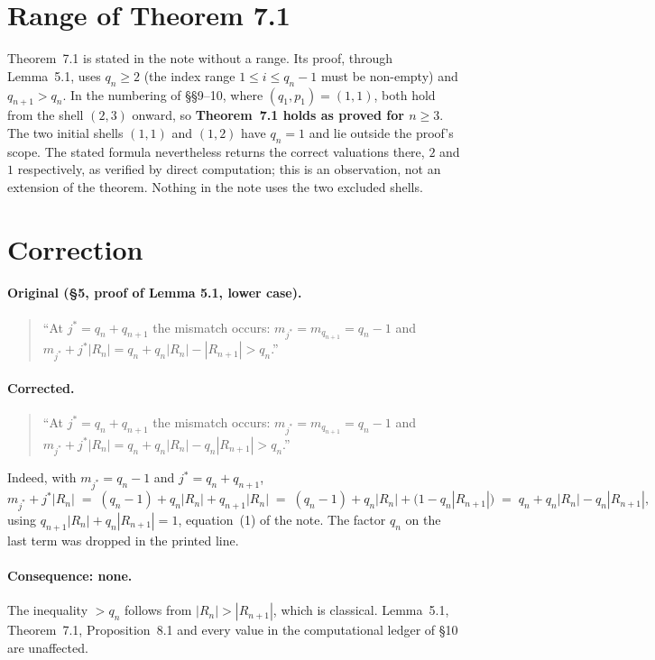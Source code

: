 \documentclass[10pt]{article}
\begin{document}
\section{Range of Theorem 7.1}

Theorem~7.1 is stated in the note without a range. Its proof, through Lemma~5.1, uses
$q_n\ge 2$ (the index range $1\le i\le q_n-1$ must be non-empty) and $q_{n+1}>q_n$. In the
numbering of \S\S9--10, where $(q_1,p_1)=(1,1)$, both hold from the shell $(2,3)$ onward, so
\textbf{Theorem~7.1 holds as proved for $n\ge 3$}. The two initial shells $(1,1)$ and $(1,2)$ have $q_n=1$ and lie outside the proof's scope. The
stated formula nevertheless returns the correct valuations there, $2$ and $1$ respectively, as
verified by direct computation; this is an observation, not an extension of the theorem. Nothing
in the note uses the two excluded shells.

\section{Correction}
\label{sec:typo}

\paragraph{Original (\S5, proof of Lemma 5.1, lower case).}
\begin{quote}
``At $j^*=q_n+q_{n+1}$ the mismatch occurs: $m_{j^*}=m_{q_{n+1}}=q_n-1$ and
$m_{j^*}+j^*|R_n| = q_n+q_n|R_n|-|R_{n+1}| > q_n$.''
\end{quote}

\paragraph{Corrected.}
\begin{quote}
``At $j^*=q_n+q_{n+1}$ the mismatch occurs: $m_{j^*}=m_{q_{n+1}}=q_n-1$ and
$m_{j^*}+j^*|R_n| = q_n+q_n|R_n|-q_n|R_{n+1}| > q_n$.''
\end{quote}

\noindent Indeed, with $m_{j^*}=q_n-1$ and $j^*=q_n+q_{n+1}$,
\[
m_{j^*}+j^*|R_n| \;=\; (q_n-1)+q_n|R_n|+q_{n+1}|R_n|
\;=\; (q_n-1)+q_n|R_n|+\bigl(1-q_n|R_{n+1}|\bigr)
\;=\; q_n+q_n|R_n|-q_n|R_{n+1}| ,
\]
using $q_{n+1}|R_n|+q_n|R_{n+1}|=1$, equation~(1) of the note. The factor $q_n$ on the last term
was dropped in the printed line.

\paragraph{Consequence: none.} The inequality $>q_n$ follows from $|R_n|>|R_{n+1}|$, which is
classical. Lemma~5.1, Theorem~7.1, Proposition~8.1 and every value in the computational ledger of
\S10 are unaffected.
\end{document}
